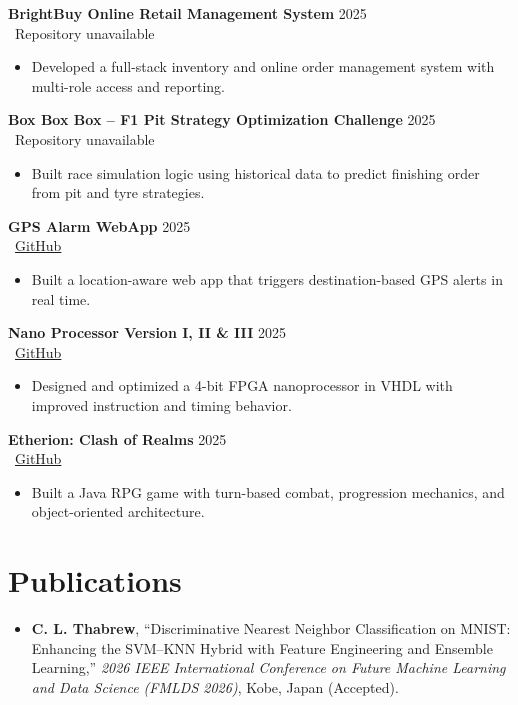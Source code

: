 \documentclass[a4paper,11pt]{article}
\begin{document}
\textbf{BrightBuy Online Retail Management System} \hfill 2025
\\ \faGithub\ Repository unavailable
\begin{itemize}
    \item Developed a full-stack inventory and online order management system with multi-role access and reporting.
\end{itemize}

\textbf{Box Box Box -- F1 Pit Strategy Optimization Challenge} \hfill 2025
\\ \faGithub\ Repository unavailable
\begin{itemize}
    \item Built race simulation logic using historical data to predict finishing order from pit and tyre strategies.
\end{itemize}

\textbf{GPS Alarm WebApp} \hfill 2025
\\ \faGithub\ \href{https://github.com/lakaThabrew/GPS_Alarm_WebApp}{GitHub}
\begin{itemize}
    \item Built a location-aware web app that triggers destination-based GPS alerts in real time.
\end{itemize}

\textbf{Nano Processor Version I, II \& III} \hfill 2025
\\ \faGithub\ \href{https://github.com/lakaThabrew/Nano_processor_Version_3}{GitHub}
\begin{itemize}
    \item Designed and optimized a 4-bit FPGA nanoprocessor in VHDL with improved instruction and timing behavior.
\end{itemize}

\textbf{Etherion: Clash of Realms} \hfill 2025
\\ \faGithub\ \href{https://github.com/lakaThabrew/Etherion_Clash_of_the_Realm}{GitHub}
\begin{itemize}
    \item Built a Java RPG game with turn-based combat, progression mechanics, and object-oriented architecture.
\end{itemize}

\section*{Publications}
\begin{itemize}
    \item \textbf{C. L. Thabrew}, ``Discriminative Nearest Neighbor Classification on MNIST: Enhancing the SVM--KNN Hybrid with Feature Engineering and Ensemble Learning,'' \textit{2026 IEEE International Conference on Future Machine Learning and Data Science (FMLDS 2026)}, Kobe, Japan (Accepted).
\end{itemize}
\end{document}

